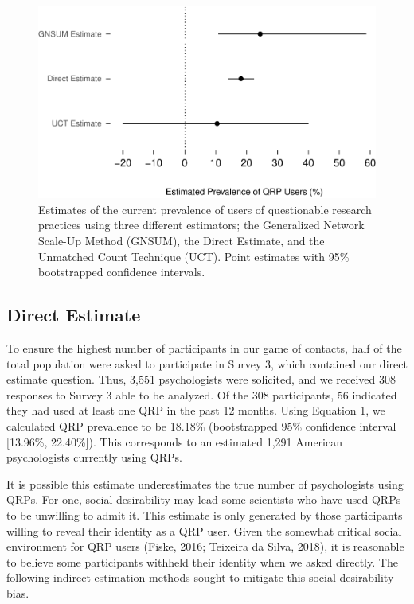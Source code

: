 \documentclass[jou]{apa6}
\theoremstyle{definition}
\theoremstyle{definition}
\theoremstyle{definition}
\theoremstyle{remark}
\begin{document}
\begin{figure}
\centering
\includegraphics{How_Many_QRP_Users_preprint_files/figure-latex/unnamed-chunk-13-1.pdf}
\caption{\label{fig:unnamed-chunk-13}\label{fig:estimate}Estimates of the
current prevalence of users of questionable research practices using
three different estimators; the Generalized Network Scale-Up Method
(GNSUM), the Direct Estimate, and the Unmatched Count Technique (UCT).
Point estimates with 95\% bootstrapped confidence intervals.}
\end{figure}

\subsection{Direct Estimate}\label{direct-estimate-1}

To ensure the highest number of participants in our game of contacts,
half of the total population were asked to participate in Survey 3,
which contained our direct estimate question. Thus, 3,551 psychologists
were solicited, and we received 308 responses to Survey 3 able to be
analyzed. Of the 308 participants, 56 indicated they had used at least
one QRP in the past 12 months. Using Equation 1, we calculated QRP
prevalence to be 18.18\% (bootstrapped 95\% confidence interval
{[}13.96\%, 22.40\%{]}). This corresponds to an estimated 1,291 American
psychologists currently using QRPs.

It is possible this estimate underestimates the true number of
psychologists using QRPs. For one, social desirability may lead some
scientists who have used QRPs to be unwilling to admit it. This estimate
is only generated by those participants willing to reveal their identity
as a QRP user. Given the somewhat critical social environment for QRP
users (Fiske, 2016; Teixeira da Silva, 2018), it is reasonable to
believe some participants withheld their identity when we asked
directly. The following indirect estimation methods sought to mitigate
this social desirability bias.
\end{document}
